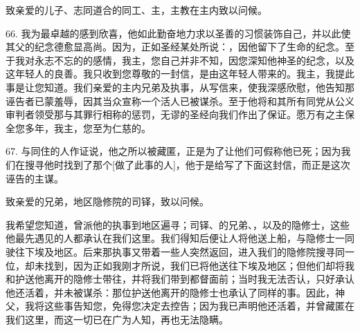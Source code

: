 \par

致亲爱的儿子、志同道合的同工、主，主教在主内致以问候。\par

66. 我为最卓越的感到欣喜，他如此勤奋地力求以圣善的习惯装饰自己，并以此使其父的纪念德愈显高尚。因为，正如圣经某处所说：，因他留下了生命的纪念。至于我对永志不忘的的感情，我主，您自己并非不知，因您深知他神圣的纪念，以及这年轻人的良善。我只收到您尊敬的一封信，是由这年轻人带来的。我主，我提此事是让您知道。我们亲爱的主内兄弟及执事，从写信来，使我深感欣慰，他告知那诬告者已蒙羞辱，因其当众宣称一个活人已被谋杀。至于他将和其所有同党从公义审判者领受那与其罪行相称的惩罚，无谬的圣经向我们作出了保证。\newline{}愿万有之主保全您多年，我主，您至为仁慈的。\par

67. 与同住的人作证说，他之所以被藏匿，正是为了让他们可假称他已死；因为我们在搜寻他时找到了那个[做了此事的人]，他于是给写了下面这封信，而正是这次诬告的主谋。\par

致亲爱的兄弟，地区隐修院的司铎，致以问候。\par

我希望您知道，曾派他的执事到地区遍寻；司铎、的兄弟、，以及的隐修士，这些他最先遇见的人都承认在我们这里。我们得知后便让人将他送上船，与隐修士一同驶往下埃及地区。后来那执事又带着一些人突然返回，进入我们的隐修院搜寻同一位，却未找到，因为正如我刚才所说，我们已将他送往下埃及地区；但他们却将我和护送他离开的隐修士带往，并将我们带到都督面前；当时我无法否认，只好承认他还活着，并未被谋杀：那位护送他离开的隐修士也承认了同样的事。因此，神父，我将这些事告知您，免得您决定去控告；因为我已声明他还活着，并曾藏匿在我们这里，而这一切已在广为人知，再也无法隐瞒。\par

\par

